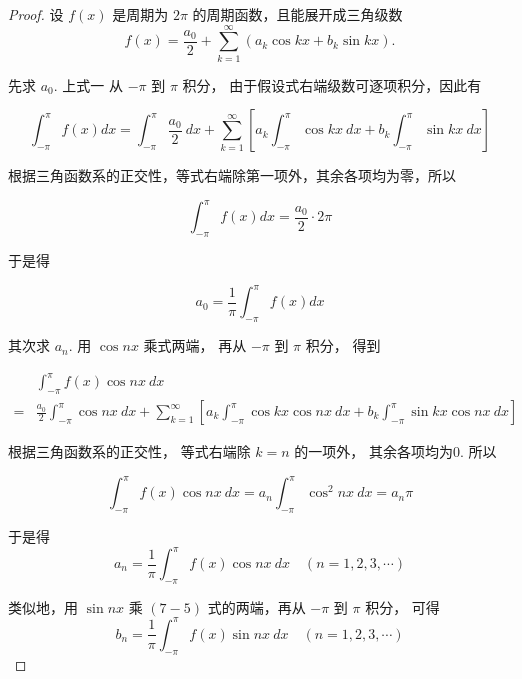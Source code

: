 \begin{proof}
    设 $ f(x) $ 是周期为 $ 2 \pi $ 的周期函数，且能展开成三角级数
\begin{equation}
f(x)=\frac{a_{0}}{2}+\sum_{k=1}^{\infty}\left(a_{k} \cos k x+b_{k} \sin k x\right) .
\end{equation}

先求 $ a_{0} $. 上式一 从 $ -\pi $ 到 $ \pi $ 积分， 由于假设式右端级数可逐项积分，因此有

\begin{equation} \int_{-\pi}^{\pi} f(x) {d} x=\int_{-\pi}^{\pi} \frac{a_{0}}{2} {~d} x+\sum_{k=1}^{\infty}\left[a_{k} \int_{-\pi}^{\pi} \cos k x {~d} x+b_{k} \int_{-\pi}^{\pi} \sin k x {~d} x\right] \end{equation}

根据三角函数系的正交性，等式右端除第一项外，其余各项均为零，所以

\begin{equation} \int_{-\pi}^{\pi} f(x) {d} x=\frac{a_{0}}{2} \cdot 2 \pi \end{equation}

于是得

\begin{equation} a_{0}=\frac{1}{\pi} \int_{-\pi}^{\pi} f(x) {d} x \end{equation}

其次求 $ a_{n} . $ 用 $ \cos n x $ 乘式两端， 再从 $ -\pi $ 到 $ \pi $ 积分， 得到

\begin{equation} \begin{aligned}  &\int_{-\pi}^{\pi} f(x) \cos n x {~d} x\\ =&\frac{a_{0}}{2} \int_{-\pi}^{\pi} \cos n x {~d} x+\sum_{k=1}^{\infty}\left[a_{k} \int_{-\pi}^{\pi} \cos k x \cos n x {~d} x+b_{k} \int_{-\pi}^{\pi} \sin k x \cos n x {~d} x\right] \end{aligned} \end{equation}

根据三角函数系的正交性， 等式右端除 $ k=n $ 的一项外， 其余各项均为0. 所以

\begin{equation} \int_{-\pi}^{\pi} f(x) \cos n x {~d} x=a_{n} \int_{-\pi}^{\pi} \cos ^{2} n x {~d} x=a_{n} \pi \end{equation}

于是得\begin{equation} a_{n}=\frac{1}{\pi} \int_{-\pi}^{\pi} f(x) \cos n x {~d} x \quad(n=1,2,3, \cdots) \end{equation}

类似地，用 $ \sin n x $ 乘 $ (7-5) $ 式的两端，再从 $ -\pi $ 到 $ \pi $ 积分， 可得
\begin{equation}
b_{n}=\frac{1}{\pi} \int_{-\pi}^{\pi} f(x) \sin n x {~d} x \quad(n=1,2,3, \cdots)
\end{equation}
\end{proof}

